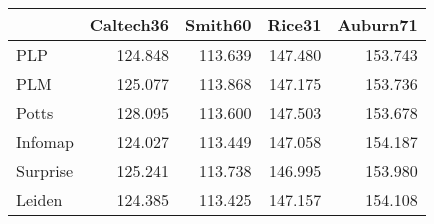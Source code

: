 \begin{tabular}{lrrrr}
\toprule
{} & Caltech36 & Smith60 &  Rice31 & Auburn71 \\
\midrule
PLP      &   124.848 & 113.639 & 147.480 &  153.743 \\
PLM      &   125.077 & 113.868 & 147.175 &  153.736 \\
Potts    &   128.095 & 113.600 & 147.503 &  153.678 \\
Infomap  &   124.027 & 113.449 & 147.058 &  154.187 \\
Surprise &   125.241 & 113.738 & 146.995 &  153.980 \\
Leiden   &   124.385 & 113.425 & 147.157 &  154.108 \\
\bottomrule
\end{tabular}
